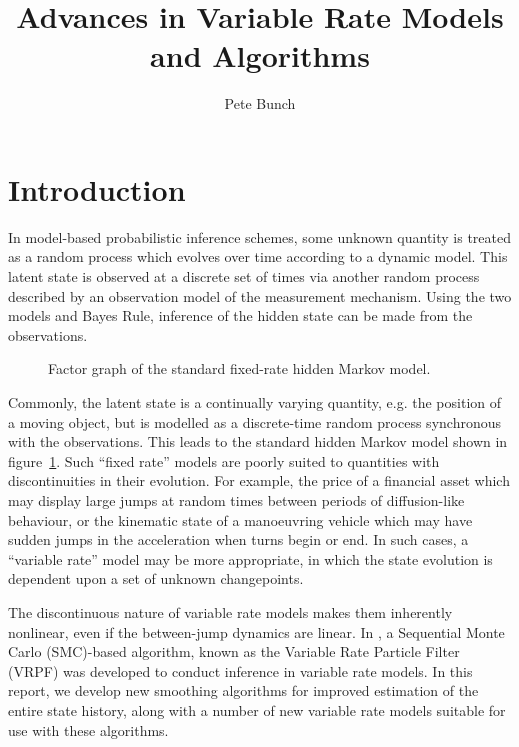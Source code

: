 \documentclass[a4paper,10pt]{article}
\title{Advances in Variable Rate Models and Algorithms}
\author{Pete Bunch}
\begin{document}
\maketitle

\begin{abstract}

\end{abstract}



\section{Introduction}
In model-based probabilistic inference schemes, some unknown quantity is treated as a random process which evolves over time according to a dynamic model. This latent state is observed at a discrete set of times via another random process described by an observation model of the measurement mechanism. Using the two models and Bayes Rule, inference of the hidden state can be made from the observations.

\begin{figure}[!h]

\caption{Factor graph of the standard fixed-rate hidden Markov model.}
\label{fig:HMM}
\end{figure}

Commonly, the latent state is a continually varying quantity, e.g. the position of a moving object, but is modelled as a discrete-time random process synchronous with the observations. This leads to the standard hidden Markov model shown in figure~\ref{fig:HMM}. Such ``fixed rate'' models are poorly suited to quantities with discontinuities in their evolution. For example, the price of a financial asset which may display large jumps at random times between periods of diffusion-like behaviour, or the kinematic state of a manoeuvring vehicle which may have sudden jumps in the acceleration when turns begin or end. In such cases, a ``variable rate'' model may be more appropriate, in which the state evolution is dependent upon a set of unknown changepoints.

The discontinuous nature of variable rate models makes them inherently nonlinear, even if the between-jump dynamics are linear. In \cite{Godsill2007,Godsill2007a}, a Sequential Monte Carlo (SMC)-based algorithm, known as the Variable Rate Particle Filter (VRPF) was developed to conduct inference in variable rate models. In this report, we develop new smoothing algorithms for improved estimation of the entire state history, along with a number of new variable rate models suitable for use with these algorithms.
\end{document}
